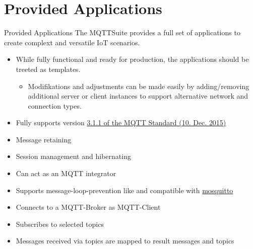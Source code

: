 ﻿\section[withsectionpage]{Provided Applications}

\begin{frame}{Provided Applications}
    The \alert{MQTTSuite} provides a full \alert{set of applications} to create complext and versatile \alert{IoT scenarios}.
    \begin{itemize}
        \item While \alert{fully functional} and \alert{ready for production}, the applications should be \alert{treeted as templates}.
        \begin{itemize}
            \item \alert{Modifikations} and \alert{adjustments} can be made easily by \alert{adding/removing} additional \alert{server or client} instances to support \alert{alternative network and connection} types.
    \end{itemize}
    \end{itemize}
    \begin{description}[MQTTIntegrator]
        \item [MQTTBroker]
        \begin{itemize}
            \item Fully supports version \href{https://docs.oasis-open.org/mqtt/mqtt/v3.1.1/mqtt-v3.1.1.html}{\textcolor{fh-ooe-red}{3.1.1 of the MQTT Standard} (10. Dec. 2015)}
            \item Message \alert{retaining}
            \item Session \alert{management} and \alert{hibernating}
            \item Can \alert{act as} an MQTT \alert{integrator}
            \item Supports \alert{message-loop-prevention} like and compatible with \href{https://mosquitto.org/}{\textcolor{fh-ooe-red}{mosquitto}}
        \end{itemize}
        \item [MQTTIntegrator]
        \begin{itemize}
            \item Connects to a MQTT-Broker as MQTT-Client
            \item \alert{Subscribes} to selected \alert{topics}
            \item \alert{Messages} received via \alert{topics} are \alert{mapped} to \alert{result messages and topics}

\end{itemize}
\end{description}
\end{frame}
